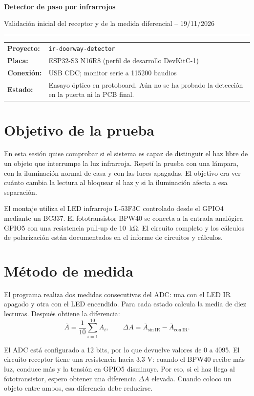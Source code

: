 \documentclass[11pt,a4paper]{article}
\newcommand{\encabezado}[2]{%
  {\Large\bfseries #1\par}
  \vspace{0.25em}
  {\normalsize #2\par}
  \vspace{0.5em}\hrule\vspace{0.6em}
}
\begin{document}
\encabezado{Detector de paso por infrarrojos}{Validación inicial del receptor y de la medida diferencial -- 19/11/2026}

\begin{tabularx}{\linewidth}{@{}lX@{}}
\textbf{Proyecto:} & \texttt{ir-doorway-detector}\\
\textbf{Placa:} & ESP32-S3 N16R8 (perfil de desarrollo DevKitC-1)\\
\textbf{Conexión:} & USB CDC; monitor serie a 115200 baudios\\
\textbf{Estado:} & Ensayo óptico en protoboard. Aún no se ha probado la detección en la puerta ni la PCB final.\\
\end{tabularx}

\section{Objetivo de la prueba}
En esta sesión quise comprobar si el sistema es capaz de distinguir el haz libre de un objeto que interrumpe la luz infrarroja. Repetí la prueba con una lámpara, con la iluminación normal de casa y con las luces apagadas. El objetivo era ver cuánto cambia la lectura al bloquear el haz y si la iluminación afecta a esa separación.

El montaje utiliza el LED infrarrojo L-53F3C controlado desde el GPIO4 mediante un BC337. El fototransistor BPW40 se conecta a la entrada analógica GPIO5 con una resistencia pull-up de \SI{10}{\kilo\ohm}. El circuito completo y los cálculos de polarización están documentados en el informe de circuitos y cálculos.

\section{Método de medida}
El programa realiza dos medidas consecutivas del ADC: una con el LED IR apagado y otra con el LED encendido. Para cada estado calcula la media de diez lecturas. Después obtiene la diferencia:
\begin{equation}
\overline{A}=\frac{1}{10}\sum_{i=1}^{10}A_i,\qquad
\Delta A=\overline{A}_{\mathrm{sin\ IR}}-\overline{A}_{\mathrm{con\ IR}}.
\label{eq:delta}
\end{equation}

El ADC está configurado a 12 bits, por lo que devuelve valores de 0 a 4095. El circuito receptor tiene una resistencia hacia 3,3 V: cuando el BPW40 recibe más luz, conduce más y la tensión en GPIO5 disminuye. Por eso, si el haz llega al fototransistor, espero obtener una diferencia $\Delta A$ elevada. Cuando coloco un objeto entre ambos, esa diferencia debe reducirse.
\end{document}
